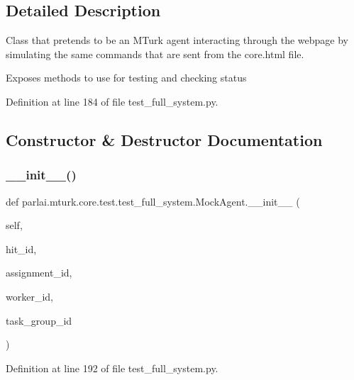 \subsection{Detailed Description}
\begin{DoxyVerb}Class that pretends to be an MTurk agent interacting through the webpage by
simulating the same commands that are sent from the core.html file.

Exposes methods to use for testing and checking status
\end{DoxyVerb}
 

Definition at line 184 of file test\+\_\+full\+\_\+system.\+py.



\subsection{Constructor \& Destructor Documentation}
\mbox{\label{classparlai_1_1mturk_1_1core_1_1test_1_1test__full__system_1_1MockAgent_a68f39f241ca2ab60cc7bb93b282e84d7}} 
\subsubsection{\texorpdfstring{\+\_\+\+\_\+init\+\_\+\+\_\+()}{\_\_init\_\_()}}
{\footnotesize\ttfamily def parlai.\+mturk.\+core.\+test.\+test\+\_\+full\+\_\+system.\+Mock\+Agent.\+\_\+\+\_\+init\+\_\+\+\_\+ (\begin{DoxyParamCaption}\item[{}]{self,  }\item[{}]{hit\+\_\+id,  }\item[{}]{assignment\+\_\+id,  }\item[{}]{worker\+\_\+id,  }\item[{}]{task\+\_\+group\+\_\+id }\end{DoxyParamCaption})}



Definition at line 192 of file test\+\_\+full\+\_\+system.\+py.


